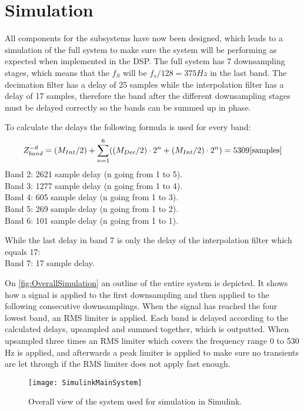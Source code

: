 \chapter{Simulation}
All components for the subsystems have now been designed, which leads to a simulation of the full system to make sure the system will be performing as expected when implemented in the DSP. The full system has 7 downsampling stages, which means that the $f_S$ will be $f_s/128=375 Hz$ in the last band. The decimation filter has a delay of 25 samples while the interpolation filter has a delay of 17 samples, therefore the band after the different downsampling stages must be delayed correctly so the bands can be summed up in phase. 

To calculate the delays the following formula is used for every band:
\begin{equation}
Z^{-d}_{band} = (M_{Int}/2) + \sum_{n=1}^{6} ((M_{Dec}/2)\cdot 2^n+(M_{Int}/2)\cdot 2^n) = 5309\enhed{samples}
\label{eq:delays}
\end{equation}
Band 2: 2621 sample delay (n going from 1 to 5). \\
Band 3: 1277 sample delay (n going from 1 to 4). \\
Band 4: 605 sample delay (n going from 1 to 3). \\
Band 5: 269 sample delay (n going from 1 to 2). \\
Band 6: 101 sample delay (n going from 1 to 1). 

While the last delay in band 7 is only the delay of the interpolation filter which equals 17: \\
Band 7: 17 sample delay.


On \autoref{fig:OverallSimulation} an outline of the entire system is depicted. It shows how a signal is applied to the first downsampling and then applied to the following consecutive downsamplings. When the signal has reached the four lowest band, an RMS limiter is applied. Each band is delayed according to the calculated delays, upsampled and summed together, which is outputted. When upsampled three times an RMS limiter which covers the frequency range 0 to 530 Hz is applied, and afterwards a peak limiter is applied to make sure no transients are let through if the RMS limiter does not apply fast enough.  

\begin{figure}[H]
\centering
\texttt{[image: SimulinkMainSystem]}
\caption{Overall view of the system used for simulation in Simulink.}
\label{fig:OverallSimulation}
\end{figure}

